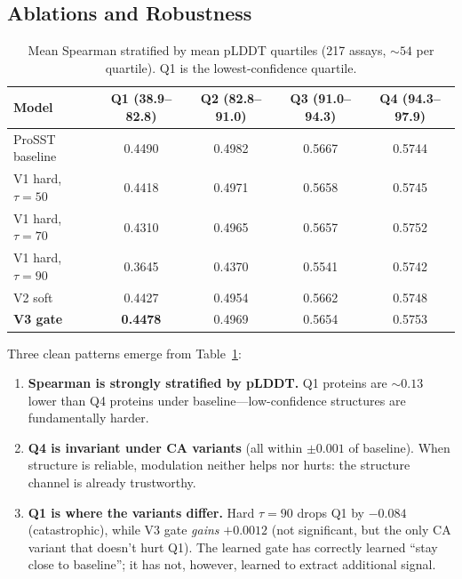 \documentclass[11pt,a4paper]{article}
\begin{document}
\subsection{Ablations and Robustness}

\begin{table}[h]
\centering
\caption{Mean Spearman stratified by mean pLDDT quartiles (217 assays,
$\sim\!54$ per quartile). Q1 is the lowest-confidence quartile.}
\label{tab:strat}
\begin{tabular}{lcccc}
\toprule
Model & Q1 (38.9--82.8) & Q2 (82.8--91.0) & Q3 (91.0--94.3) & Q4 (94.3--97.9) \\
\midrule
ProSST baseline               & 0.4490 & 0.4982 & 0.5667 & 0.5744 \\
V1 hard, $\tau{=}50$          & 0.4418 & 0.4971 & 0.5658 & 0.5745 \\
V1 hard, $\tau{=}70$          & 0.4310 & 0.4965 & 0.5657 & 0.5752 \\
V1 hard, $\tau{=}90$          & 0.3645 & 0.4370 & 0.5541 & 0.5742 \\
V2 soft                       & 0.4427 & 0.4954 & 0.5662 & 0.5748 \\
\textbf{V3 gate}              & \textbf{0.4478} & 0.4969 & 0.5654 & 0.5753 \\
\bottomrule
\end{tabular}
\end{table}

Three clean patterns emerge from Table~\ref{tab:strat}:

\begin{enumerate}[leftmargin=*]
    \item \textbf{Spearman is strongly stratified by pLDDT.} Q1 proteins
    are $\sim\!0.13$ lower than Q4 proteins under baseline---low-confidence
    structures are fundamentally harder.
    \item \textbf{Q4 is invariant under CA variants} (all within $\pm 0.001$
    of baseline). When structure is reliable, modulation neither helps nor
    hurts: the structure channel is already trustworthy.
    \item \textbf{Q1 is where the variants differ.} Hard $\tau{=}90$
    drops Q1 by $-0.084$ (catastrophic), while V3 gate \emph{gains}
    $+0.0012$ (not significant, but the only CA variant that doesn't hurt
    Q1). The learned gate has correctly learned ``stay close to baseline'';
    it has not, however, learned to extract additional signal.
\end{enumerate}
\end{document}
